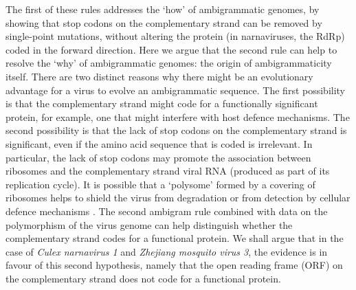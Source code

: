 \documentclass[unnumsec,webpdf,contemporary,large]{oup-authoring-template}%
\theoremstyle{thmstyleone}%
\theoremstyle{thmstyletwo}%
\theoremstyle{thmstylethree}%
\begin{document}
The first of these rules addresses the \lq how' of  ambigrammatic genomes, by showing that
stop codons on the complementary strand can be removed by single-point mutations, without
altering the protein (in narnaviruses, the RdRp) coded in the forward direction. Here we argue that the
second rule can help to resolve the \lq why' of ambigrammatic genomes:
the origin of ambigrammaticity itself. There are two
distinct reasons why there might be an evolutionary advantage for a virus to evolve an
ambigrammatic sequence. The first possibility is that the complementary strand might code
for a functionally significant protein, for example, one that might interfere with host defence mechanisms.
The second possibility is that the lack of stop codons on the complementary strand
is significant, even if the amino acid sequence that is coded is irrelevant. In particular, the lack of stop codons
may promote the association between ribosomes and the complementary strand viral RNA (produced as part of its
replication cycle). It is possible that a \lq polysome' formed by a covering of ribosomes helps to shield
the virus from degradation or from detection by cellular defence mechanisms \citep{Cep20,Ret+20,Wil+21}.
The second ambigram rule combined with data on the polymorphism of the
virus genome can help distinguish whether the complementary strand codes for a functional protein.
We shall argue that in the case of \emph{Culex narnavirus 1} and \emph{Zhejiang mosquito virus 3}, the evidence
is in favour of this second hypothesis, namely that the open reading frame (ORF) on the complementary strand does
not code for a functional protein.
\end{document}
